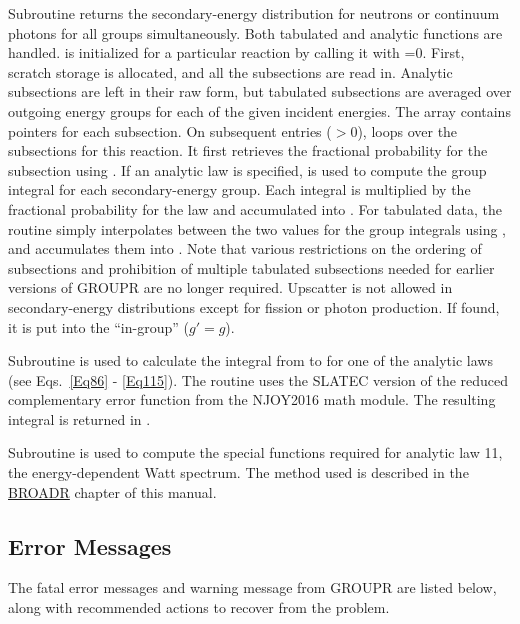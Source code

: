 Subroutine 
returns the secondary-energy distribution for
neutrons or continuum photons for all groups simultaneously.  Both
tabulated and analytic functions are handled.   is
initialized for a particular reaction by calling it with =0.
First, scratch storage is allocated, and all the  subsections are read in.
Analytic subsections are left in their raw form, but tabulated subsections
are averaged over outgoing energy groups for each of the given incident
energies.  The array  contains pointers for each subsection.
On subsequent entries ($>$0),  loops over the
subsections for this reaction.  It first retrieves the fractional
probability for the subsection using .
If an analytic law is specified, 
is used to compute the group integral for each secondary-energy
group.  Each integral is multiplied by the fractional probability
for the law and accumulated into .  For tabulated data,
the routine simply interpolates between the two values for the
group integrals using , and accumulates them
into .  Note that various restrictions on the ordering of
subsections and prohibition of multiple tabulated subsections needed
for earlier versions of GROUPR are no longer required.  Upscatter
is not allowed in secondary-energy distributions except for fission
or photon production.  If found, it is put into the ``in-group''
($g'{=}g$).

Subroutine 
is used to calculate the integral from
 to  for one of the analytic laws (see
Eqs.~\ref{Eq86} - \ref{Eq115}).  The routine uses the SLATEC version
of the reduced complementary error function from the NJOY2016
math module.  The resulting integral is returned
in .

Subroutine  is used to compute
the special functions required for analytic law 11, the energy-dependent
Watt spectrum.  The method used is described in the
\hyperlink{sBROADRhy}{BROADR}
chapter of this manual.


\subsection{Error Messages}
\label{ssGROUPR_msg}

The fatal error messages and warning message from GROUPR
are listed below, along with recommended actions to recover
from the problem.


